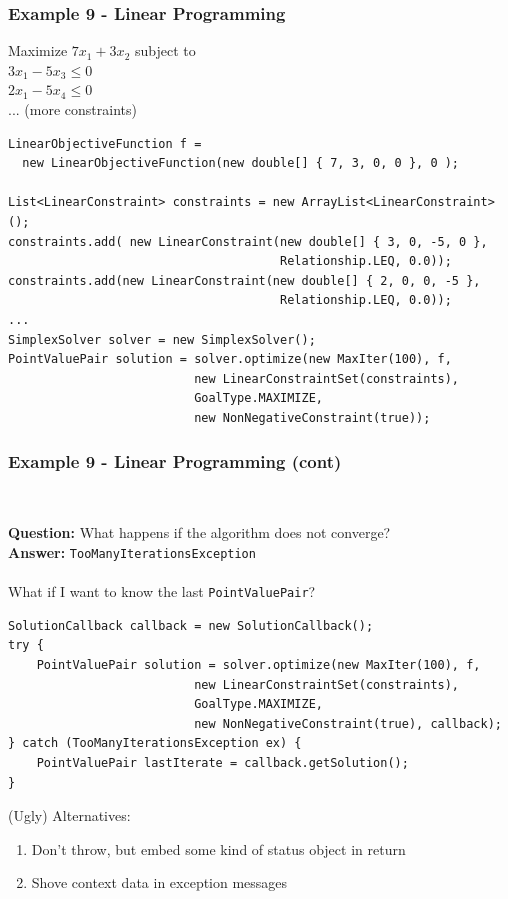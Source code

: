 \documentclass[14pt,mathserif]{beamer}
\begin{document}
\begin{frame}[fragile]
  \frametitle{Example 9 - Linear Programming} 

\begin{small}
Maximize \(7x_1 + 3x_2\) subject to \\
\(3x_1 - 5x_3 \leq 0\) \\
\(2x_1 -5x_4 \leq 0\) \\
... (more constraints)

\begin{verbatim}
LinearObjectiveFunction f = 
  new LinearObjectiveFunction(new double[] { 7, 3, 0, 0 }, 0 );

List<LinearConstraint> constraints = new ArrayList<LinearConstraint>();
constraints.add( new LinearConstraint(new double[] { 3, 0, -5, 0 },
                                      Relationship.LEQ, 0.0));  
constraints.add(new LinearConstraint(new double[] { 2, 0, 0, -5 },
                                      Relationship.LEQ, 0.0));
...
SimplexSolver solver = new SimplexSolver();
PointValuePair solution = solver.optimize(new MaxIter(100), f,
                          new LinearConstraintSet(constraints),
                          GoalType.MAXIMIZE,
                          new NonNegativeConstraint(true));
\end{verbatim}
\end{small}
\end{frame}

\begin{frame}[fragile]
  \frametitle{Example 9 - Linear Programming (cont)} 
\\ 
\begin{small}
\textbf{Question:} What happens if the algorithm does not converge? \\
\textbf{Answer:} \texttt{TooManyIterationsException} \\~\\
What if I want to know the last \texttt{PointValuePair}?

\begin{verbatim}
SolutionCallback callback = new SolutionCallback();
try {
    PointValuePair solution = solver.optimize(new MaxIter(100), f,
                          new LinearConstraintSet(constraints),
                          GoalType.MAXIMIZE,
                          new NonNegativeConstraint(true), callback);
} catch (TooManyIterationsException ex) {
	PointValuePair lastIterate = callback.getSolution();
}
\end{verbatim}

(Ugly) Alternatives:
\begin{enumerate}
\item Don't throw, but embed some kind of status object in return
\item Shove context data in exception messages
\end{enumerate}
\end{small}
\end{frame}
\end{document}
